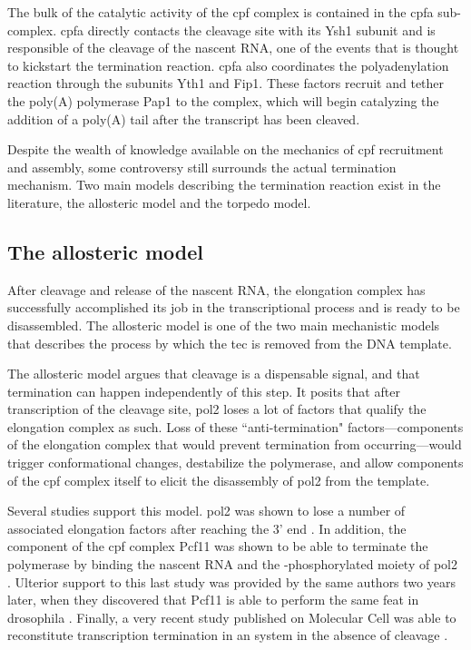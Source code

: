 The bulk of the catalytic activity of the \gls{cpf} complex is contained in the \gls{cpfa} sub-complex.
\gls{cpfa} directly contacts the cleavage site with its Ysh1 subunit and is responsible of the cleavage of the nascent RNA, one of the events that is thought to kickstart the termination reaction.
\gls{cpfa} also coordinates the polyadenylation reaction through the subunits Yth1 and Fip1. 
These factors recruit and tether the poly(A) polymerase Pap1 to the complex, which will begin catalyzing the addition of a poly(A) tail after the transcript has been cleaved.

Despite the wealth of knowledge available on the mechanics of \gls{cpf} recruitment and assembly, some controversy still surrounds the actual termination mechanism.
Two main models describing the termination reaction exist in the literature, the allosteric model and the torpedo model.

\subsection{The allosteric model}

After cleavage and release of the nascent RNA, the elongation complex has successfully accomplished its job in the transcriptional process and is ready to be disassembled.
The allosteric model is one of the two main mechanistic models that describes the process by which the \gls{tec} is removed from the DNA template.

The allosteric model argues that cleavage is a dispensable signal, and that termination can happen independently of this step.
It posits that after transcription of the cleavage site, \gls{pol2} loses a lot of factors that qualify the elongation complex as such.
Loss of these ``anti-termination" factors---components of the elongation complex that would prevent termination from occurring---would trigger conformational changes, destabilize the polymerase, and allow components of the \gls{cpf} complex itself to elicit the disassembly of \gls{pol2} from the template.

Several studies support this model. 
\gls{pol2} was shown to lose a number of associated elongation factors after reaching the 3' end \citep{kim:2004:transitions}.
In addition, the component of the \gls{cpf} complex Pcf11 was shown to be able to terminate the polymerase \invitro{} by binding the nascent RNA and the \sert{}-phosphorylated moiety of \gls{pol2} \citep{zhang:2005:ctddependent}.
Ulterior support to this last study was provided by the same authors two years later, when they discovered that Pcf11 is able to perform the same feat in drosophila \citep{zhang:2006:pcf11}.
Finally, a very recent study published on Molecular Cell was able to reconstitute transcription termination in an \invitro{} system in the absence of cleavage \citep{zhang:2015:polya}.

